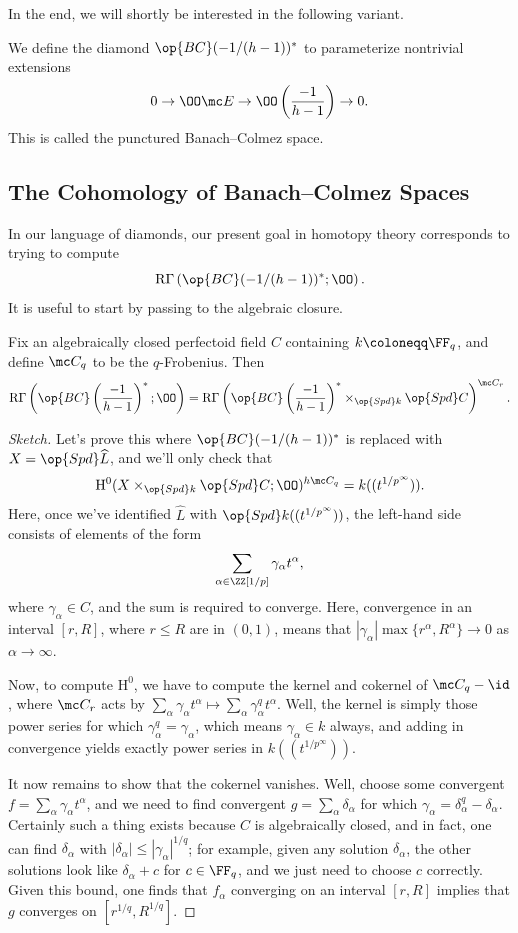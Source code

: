 \documentclass[../notes.tex]{subfiles}
\begin{document}
In the end, we will shortly be interested in the following variant.
\begin{notation}
	We define the diamond $\op{BC}(-1/(h-1))^*$ to parameterize nontrivial extensions
	\[0\to\OO\mc E\to\OO\left(\frac{-1}{h-1}\right)\to0.\]
	This is called the punctured Banach--Colmez space.
\end{notation}

\subsection{The Cohomology of Banach--Colmez Spaces}
In our language of diamonds, our present goal in homotopy theory corresponds to trying to compute
\[\mathrm R\Gamma\left(\op{BC}(-1/(h-1))^*;\OO\right).\]
It is useful to start by passing to the algebraic closure.
\begin{proposition}
	Fix an algebraically closed perfectoid field $C$ containing $k\coloneqq\FF_q$, and define $\mc C_q$ to be the $q$-Frobenius. Then
	\[\mathrm R\Gamma\left(\op{BC}\left(\frac{-1}{h-1}\right)^*;\OO\right)=\mathrm R\Gamma\left(\op{BC}\left(\frac{-1}{h-1}\right)^*\times_{\op{Spd}k}\op{Spd}C\right)^{\mc C_r}.\]
\end{proposition}
\begin{proof}[Sketch]
	Let's prove this where $\op{BC}(-1/(h-1))^*$ is replaced with $X=\op{Spd}\widehat L$, and we'll only check that
	\[\mathrm H^0(X\times_{\op{Spd}k}\op{Spd}C;\OO)^{h\mc C_q}=k((t^{1/p^\infty})).\]
	Here, once we've identified $\widehat L$ with $\op{Spd}k((t^{1/p^\infty}))$, the left-hand side consists of elements of the form
	\[\sum_{\alpha\in\ZZ[1/p]}\gamma_\alpha t^\alpha,\]
	where $\gamma_\alpha\in C$, and the sum is required to converge. Here, convergence in an interval $[r,R]$, where $r\le R$ are in $(0,1)$, means that $\left|\gamma_\alpha\right|\max\{r^\alpha,R^\alpha\}\to0$ as $\alpha\to\infty$.

	Now, to compute $\mathrm H^0$, we have to compute the kernel and cokernel of $\mc C_q-\id$, where $\mc C_r$ acts by $\sum_\alpha\gamma_\alpha t^\alpha\mapsto\sum_\alpha\gamma_\alpha^qt^\alpha$. Well, the kernel is simply those power series for which $\gamma_\alpha^q=\gamma_\alpha$, which means $\gamma_\alpha\in k$ always, and adding in convergence yields exactly power series in $k((t^{1/p^\infty}))$.

	It now remains to show that the cokernel vanishes. Well, choose some convergent $f=\sum_\alpha\gamma_\alpha t^\alpha$, and we need to find convergent $g=\sum_\alpha\delta_\alpha$ for which $\gamma_\alpha=\delta_\alpha^q-\delta_\alpha$. Certainly such a thing exists because $C$ is algebraically closed, and in fact, one can find $\delta_\alpha$ with $\left|\delta_\alpha\right|\le\left|\gamma_\alpha\right|^{1/q}$; for example, given any solution $\delta_\alpha$, the other solutions look like $\delta_\alpha+c$ for $c\in\FF_q$, and we just need to choose $c$ correctly. Given this bound, one finds that $f_\alpha$ converging on an interval $[r,R]$ implies that $g$ converges on $\left[r^{1/q},R^{1/q}\right]$.
\end{proof}
\end{document}
